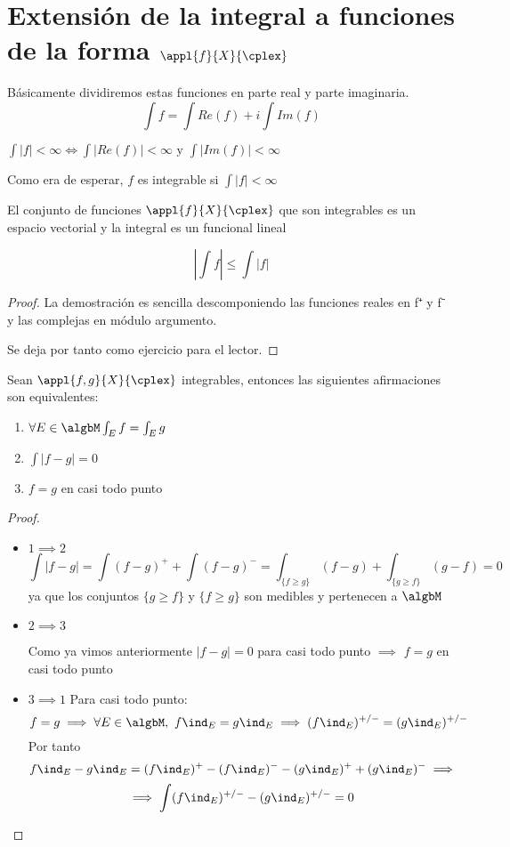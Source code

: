 \documentclass{apuntes}
\begin{document}
\section{Extensión de la integral a funciones de la forma $\appl{f}{X}{\cplex}$}
Básicamente dividiremos estas funciones en parte real y parte imaginaria.
\[\int f = \int Re(f) + i \int Im(f)\]

\obs $\int |f| < \infty \iff \int |Re(f)| < \infty \text{ y } \int |Im(f)| < \infty$

Como era de esperar, $f$ es integrable si $\int |f| < \infty$

\begin{prop}
El conjunto de funciones $\appl{f}{X}{\cplex}$ que son integrables es un espacio vectorial y la integral es un funcional lineal
\end{prop}

\begin{prop}
\[\left|\int f \right| \leq \int |f|\]
\end{prop}
\begin{proof}
La demostración es sencilla descomponiendo las funciones reales en f⁺ y f⁻  y las complejas en módulo argumento.

Se deja por tanto como ejercicio para el lector.
\end{proof}


\begin{prop}
Sean $\appl{f,g}{X}{\cplex}$ integrables, entonces las siguientes afirmaciones son equivalentes:
\begin{enumerate}
\item $\forall E \in \algbM \int_E f = \int_E g$
\item $\int |f-g| = 0$
\item $f=g$ en casi todo punto
\end{enumerate}
\end{prop}

\begin{proof}
\begin{itemize}
\item $ 1 \implies 2$
\[\int |f-g| = \int (f-g)^+ + \int (f-g)^- = \int_{\{f \geq g\}} (f-g) + \int_{\{g \geq f\}} (g-f) = 0\]
ya que los conjuntos $\{g \geq f\}$ y $\{f \geq g\}$ son medibles y pertenecen a $\algbM$
\item $2 \implies 3$

Como ya vimos anteriormente $|f-g|=0$ para casi todo punto $\implies$ $f=g$ en casi todo punto

\item $3 \implies 1$
Para casi todo punto:
\[f=g  \implies \forall E \in \algbM, \ f\ind_E =g\ind_E\implies (f\ind_E)^{+/-} = (g\ind_E)^{+/-}\]
Por tanto
\[f\ind_E - g\ind_E = (f\ind_E)^+ - (f\ind_E)^- - (g\ind_E)^+ + (g\ind_E)^- \implies \]
\[\implies \int (f\ind_E)^{+/-} - (g\ind_E)^{+/-} = 0\]
\end{itemize}
\end{proof}
\end{document}
